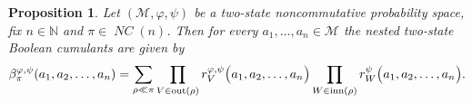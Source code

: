 \documentclass[12pt]{amsart}
\DeclareMathOperator{\NC}{\mathit{NC}} %
\DeclareMathOperator{\IB}{\mathrm{inn}} %
\DeclareMathOperator{\OB}{\mathrm{out}} %
\newcommand{\alg}[1]{\mathcal{#1}}
\newtheorem{proposition}[theorem]{Proposition}
\theoremstyle{definition}
\numberwithin{equation}{section}
\begin{document}
\begin{proposition} \label{prop:35}
	Let $(\alg{M},\varphi,\psi)$ be a two-state noncommutative probability space,
	fix $n \in \mathbb{N}$ and $\pi \in \NC(n)$. Then for every
	$a_1,\ldots,a_n\in\alg{M}$ the nested two-state Boolean cumulants are given by
	\[\beta_\pi^{\varphi,\psi}(a_1,a_2,\ldots,a_n)=\sum_{\rho\ll \pi}
	\prod_{
		V\in\OB(\rho)                   
	}
	r_{V}^{\varphi,\psi}\bigl(a_1,a_2,\ldots,a_n\bigr)
	\prod_{
		W\in\IB(\rho)
	}
	r_{W}^{\psi}\bigl(a_1,a_2,\ldots,a_n\bigr).\]
\end{proposition}
\end{document}
